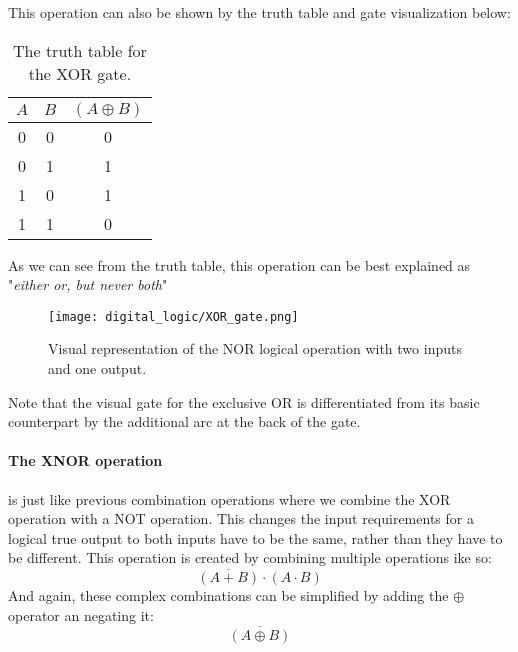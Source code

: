     This operation can also be shown by the truth table and gate visualization below:
    \begin{table}[h!]
        \begin{tabular}{c c | c}
            \toprule
            $A$ & $B$ & $(A \oplus B)$  \\
            \midrule
             0  &  0  &    0    \\
             
             0  &  1  &    1    \\
             1  &  0  &    1    \\
             1  &  1  &    0    \\
            \bottomrule
        \end{tabular}
        \caption[XOR Gate Truth Table]{The truth table for the XOR gate.}
    \end{table}

    As we can see from the truth table, this operation can be best explained as "\textit{either or, but never both}"

    \begin{figure}[h!]
        \texttt{[image: digital\_logic/XOR\_gate.png]}
        \caption[NOR Gate]{Visual representation of the NOR logical operation with two inputs and one output.}
    \end{figure}

    Note that the visual gate for the exclusive OR is differentiated from its basic counterpart by the additional arc at the back of the gate.

    \paragraph*{The XNOR operation} is just like previous combination operations where we combine the XOR operation with a NOT operation.
    This changes the input requirements for a logical true output to both inputs have to be the same, rather than they have to be different.
    This operation is created by combining multiple operations ike so:
    \begin{equation*}
        \overline{(A+B)} \cdot (A \cdot B)
    \end{equation*}
    And again, these complex combinations can be simplified by adding the $\oplus$ operator an negating it:
    \begin{equation*}
        \overline{(A \oplus B)}
    \end{equation*}


